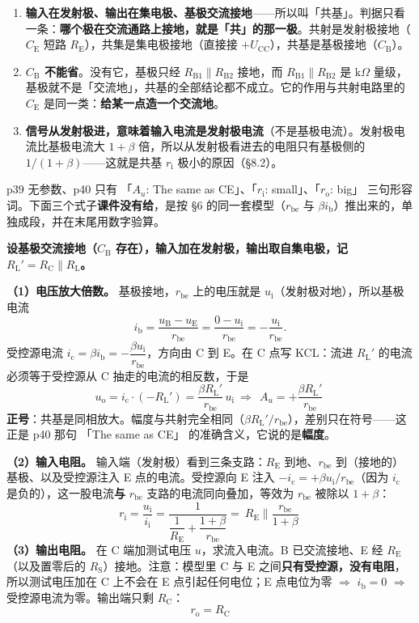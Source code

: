 \documentclass[11pt]{ctexart}
\newcommand{\UCC}{U_{\mathrm{CC}}}
\newcommand{\RBone}{R_{\mathrm{B1}}}
\newcommand{\RBtwo}{R_{\mathrm{B2}}}
\newcommand{\RC}{R_{\mathrm{C}}}
\newcommand{\RE}{R_{\mathrm{E}}}
\newcommand{\RL}{R_{\mathrm{L}}}
\newcommand{\RS}{R_{\mathrm{S}}}
\newcommand{\RLp}{R_{\mathrm{L}}'}
\newcommand{\CEcap}{C_{\mathrm{E}}}
\newcommand{\CBcap}{C_{\mathrm{B}}}
\newcommand{\rbe}{r_{\mathrm{be}}}
\newcommand{\Au}{A_{u}}
\newcommand{\ri}{r_{\mathrm{i}}}
\newcommand{\ro}{r_{\mathrm{o}}}
\newcommand{\ib}{i_{\mathrm{b}}}
\newcommand{\ic}{i_{\mathrm{c}}}
\newcommand{\iin}{i_{\mathrm{i}}}
\begin{document}
\begin{enumerate}
\item \textbf{输入在发射极、输出在集电极、基极交流接地}——所以叫「共基」。判据只看一条：\textbf{哪个极在交流通路上接地，就是「共」的那一极}。共射是发射极接地（$\CEcap$ 短路 $\RE$），共集是集电极接地（直接接 $+\UCC$），共基是基极接地（$\CBcap$）。
\item \textbf{$\CBcap$ 不能省}。没有它，基极只经 $\RBone\parallel\RBtwo$ 接地，而 $\RBone\parallel\RBtwo$ 是 $\mathrm{k}\Omega$ 量级，基极就不是「交流地」，共基的全部结论都不成立。它的作用与共射电路里的 $\CEcap$ 是同一类：\textbf{给某一点造一个交流地}。
\item \textbf{信号从发射极进，意味着输入电流是发射极电流}（不是基极电流）。发射极电流比基极电流大 $1+\beta$ 倍，所以从发射极看进去的电阻只有基极侧的 $1/(1+\beta)$——这就是共基 $\ri$ 极小的原因（§8.2）。
\end{enumerate}


p39 无参数、p40 只有 「$A_u$: The same as CE」、「$\ri$: small」、「$\ro$: big」 三句形容词。下面三个式子\textbf{课件没有给}，是按 §6 的同一套模型（$\rbe$ 与 $\beta\ib$）推出来的，单独成段，并在末尾用数字验算。

\textbf{设基极交流接地（$\CBcap$ 存在），输入加在发射极，输出取自集电极，记 $\RLp=\RC\parallel\RL$。}

\textbf{（1）电压放大倍数。} 基极接地，$\rbe$ 上的电压就是 $u_{\mathrm{i}}$（发射极对地），所以基极电流
\[ \ib=\frac{u_{\mathrm{B}}-u_{\mathrm{E}}}{\rbe}=\frac{0-u_{\mathrm{i}}}{\rbe}=-\frac{u_{\mathrm{i}}}{\rbe} . \]
受控源电流 $\ic=\beta\ib=-\dfrac{\beta u_{\mathrm{i}}}{\rbe}$，方向由 C 到 E。在 C 点写 KCL：流进 $\RLp$ 的电流必须等于受控源从 C 抽走的电流的相反数，于是
\[ u_{\mathrm{o}}=\ic\cdot\left(-\RLp\right)=\frac{\beta\RLp}{\rbe}\,u_{\mathrm{i}}\ \Longrightarrow\ \boxed{\ \Au=+\frac{\beta\RLp}{\rbe}\ } \]
\textbf{正号}：共基是同相放大。幅度与共射完全相同（$\beta\RLp/\rbe$），差别只在符号——这正是 p40 那句 「The same as CE」 的准确含义，它说的是\textbf{幅度}。

\textbf{（2）输入电阻。} 输入端（发射极）看到三条支路：$\RE$ 到地、$\rbe$ 到（接地的）基极、以及受控源注入 E 点的电流。受控源向 E 注入 $-\ic=+\beta u_{\mathrm{i}}/\rbe$（因为 $\ic$ 是负的），这一股电流\textbf{与} $\rbe$ 支路的电流同向叠加，等效为 $\rbe$ 被除以 $1+\beta$：
\[ \ri=\frac{u_{\mathrm{i}}}{\iin}=\frac{1}{\dfrac{1}{\RE}+\dfrac{1+\beta}{\rbe}}=\boxed{\ \RE\parallel\frac{\rbe}{1+\beta}\ } \]
\textbf{（3）输出电阻。} 在 C 端加测试电压 $u$，求流入电流。B 已交流接地、E 经 $\RE$（以及置零后的 $\RS$）接地。注意：模型里 C 与 E 之间\textbf{只有受控源，没有电阻}，所以测试电压加在 C 上不会在 E 点引起任何电位；E 点电位为零 $\Rightarrow$ $\ib=0$ $\Rightarrow$ 受控源电流为零。输出端只剩 $\RC$：
\[ \boxed{\ \ro=\RC\ } \]
\end{document}
